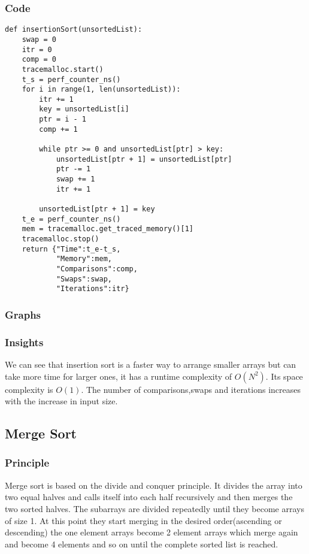 \documentclass[12pt]{article}
\begin{document}
\subsubsection*{Code}
\begin{verbatim}
def insertionSort(unsortedList):
    swap = 0
    itr = 0
    comp = 0
    tracemalloc.start()
    t_s = perf_counter_ns()
    for i in range(1, len(unsortedList)):
        itr += 1
        key = unsortedList[i]
        ptr = i - 1
        comp += 1

        while ptr >= 0 and unsortedList[ptr] > key:
            unsortedList[ptr + 1] = unsortedList[ptr]
            ptr -= 1
            swap += 1
            itr += 1

        unsortedList[ptr + 1] = key
    t_e = perf_counter_ns()
    mem = tracemalloc.get_traced_memory()[1]
    tracemalloc.stop()
    return {"Time":t_e-t_s,
            "Memory":mem,
            "Comparisons":comp,
            "Swaps":swap,
            "Iterations":itr}
\end{verbatim}
\subsubsection*{Graphs}





\subsubsection{Insights}
We can see that insertion sort is a faster way to arrange smaller
arrays but can take more time for larger ones, it has a runtime
complexity of $O(N^2)$. Its space complexity is $O(1)$. The number of
comparisons,swaps and iterations increases with the increase in
input size.
\subsection{Merge Sort}
\subsubsection*{Principle}
Merge sort is based on the divide and conquer principle. It
divides the array into two equal halves and calls itself into
each half recursively and then merges the two sorted halves. The
subarrays are divided repeatedly until they become arrays of size
1. At this point they start merging in the desired
order(ascending or descending) the one element arrays become 2
element arrays which merge again and become 4 elements and so on
until the complete sorted list is reached.
\end{document}
